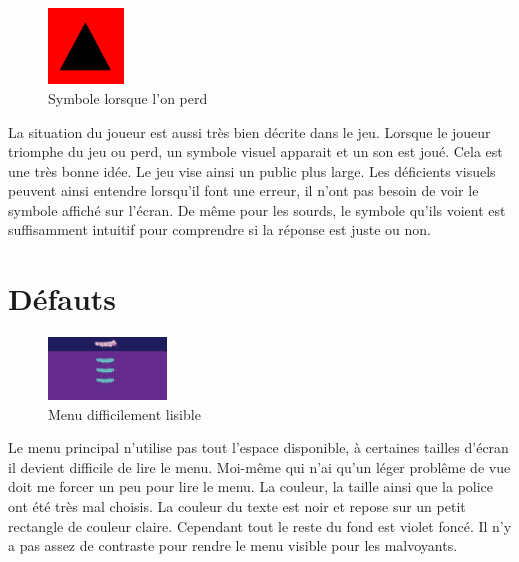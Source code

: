 \documentclass{article}
\begin{document}
\begin{figure}
  \vspace{-20pt}
  \begin{center}
    \includegraphics[width=0.18\textwidth]{5}
  \end{center}
  \vspace{-20pt}
  \caption{Symbole lorsque l'on perd}
  \vspace{-10pt}
\end{figure}

\hspace*{0.6cm}La situation du joueur est aussi tr\`es bien d\'ecrite dans le jeu. Lorsque le joueur triomphe du jeu ou perd, un symbole visuel apparait et un son est jou\'e. Cela est une tr\`es bonne id\'ee. Le jeu vise ainsi un public plus large. Les d\'eficients visuels peuvent ainsi entendre lorsqu'il font une erreur, il n'ont pas besoin de voir le symbole affich\'e sur l'\'ecran. De m\^eme pour les sourds, le symbole qu'ils voient est suffisamment intuitif pour comprendre si la r\'eponse est juste ou non.\\

\newpage

\section{D\'efauts}

\begin{figure}
  \vspace{-20pt}
  \begin{center}
    \includegraphics[width=0.28\textwidth]{2}
  \end{center}
  \vspace{-20pt}
  \caption{Menu difficilement lisible}
  \vspace{-10pt}
\end{figure}
\hspace*{0.6cm}Le menu principal n'utilise pas tout l'espace disponible, \`a certaines tailles d'\'ecran il devient difficile de lire le menu. Moi-m\^eme qui n'ai qu'un l\'eger probl\^eme de vue doit me forcer un peu pour lire le menu. La couleur, la taille ainsi que la police ont \'et\'e tr\`es mal choisis. La couleur du texte est noir et repose sur un petit rectangle de couleur claire. Cependant tout le reste du fond est violet fonc\'e. Il n'y a pas assez de contraste pour rendre le menu visible pour les malvoyants.\hfill\\
\end{document}
